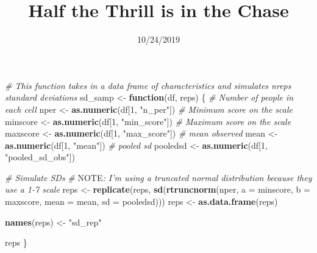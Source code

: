 \documentclass[]{article}
\title{Half the Thrill is in the Chase}
\author{}
\date{10/24/2019}
\newenvironment{Shaded}{\begin{snugshade}}{\end{snugshade}}
\newcommand{\AlertTok}[1]{\textcolor[rgb]{0.94,0.16,0.16}{#1}}
\newcommand{\CommentTok}[1]{\textcolor[rgb]{0.56,0.35,0.01}{\textit{#1}}}
\newcommand{\ControlFlowTok}[1]{\textcolor[rgb]{0.13,0.29,0.53}{\textbf{#1}}}
\newcommand{\DataTypeTok}[1]{\textcolor[rgb]{0.13,0.29,0.53}{#1}}
\newcommand{\DecValTok}[1]{\textcolor[rgb]{0.00,0.00,0.81}{#1}}
\newcommand{\KeywordTok}[1]{\textcolor[rgb]{0.13,0.29,0.53}{\textbf{#1}}}
\newcommand{\NormalTok}[1]{#1}
\newcommand{\StringTok}[1]{\textcolor[rgb]{0.31,0.60,0.02}{#1}}
\begin{document}
\maketitle

\begin{Shaded}
\begin{Highlighting}[]
\CommentTok{# This function takes in a data frame of characteristics and simulates nreps standard deviations}
\NormalTok{sd_samp <-}\StringTok{ }\ControlFlowTok{function}\NormalTok{(df, reps) \{}
  \CommentTok{# Number of people in each cell}
\NormalTok{  nper <-}\StringTok{ }\KeywordTok{as.numeric}\NormalTok{(df[}\DecValTok{1}\NormalTok{, }\StringTok{"n_per"}\NormalTok{])}
  \CommentTok{# Minimum score on the scale}
\NormalTok{  minscore <-}\StringTok{ }\KeywordTok{as.numeric}\NormalTok{(df[}\DecValTok{1}\NormalTok{, }\StringTok{"min_score"}\NormalTok{])}
  \CommentTok{# Maximum score on the scale}
\NormalTok{  maxscore <-}\StringTok{ }\KeywordTok{as.numeric}\NormalTok{(df[}\DecValTok{1}\NormalTok{, }\StringTok{"max_score"}\NormalTok{])}
  \CommentTok{# mean observed}
\NormalTok{  mean <-}\StringTok{ }\KeywordTok{as.numeric}\NormalTok{(df[}\DecValTok{1}\NormalTok{, }\StringTok{"mean"}\NormalTok{])}
  \CommentTok{# pooled sd }
\NormalTok{  pooledsd <-}\StringTok{ }\KeywordTok{as.numeric}\NormalTok{(df[}\DecValTok{1}\NormalTok{, }\StringTok{"pooled_sd_obs"}\NormalTok{])}
  
  \CommentTok{# Simulate SDs}
  \CommentTok{# }\AlertTok{NOTE}\CommentTok{: I'm using a truncated normal distribution because they use a 1-7 scale}
\NormalTok{  reps <-}\StringTok{ }\KeywordTok{replicate}\NormalTok{(reps,}
                    \KeywordTok{sd}\NormalTok{(}\KeywordTok{rtruncnorm}\NormalTok{(nper, }\DataTypeTok{a =}\NormalTok{ minscore, }\DataTypeTok{b =}\NormalTok{ maxscore, }\DataTypeTok{mean =}\NormalTok{ mean, }
                                  \DataTypeTok{sd =}\NormalTok{ pooledsd))) }
\NormalTok{  reps <-}\StringTok{ }\KeywordTok{as.data.frame}\NormalTok{(reps)}
  
  \KeywordTok{names}\NormalTok{(reps) <-}\StringTok{ "sd_rep"}
  
\NormalTok{  reps}
\NormalTok{\}}
\end{Highlighting}
\end{Shaded}
\end{document}
